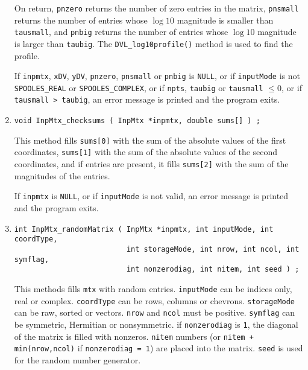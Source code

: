 \begin{enumerate}
On return, 
{\tt *pnzero} returns the number of zero entries in the matrix,
{\tt *pnsmall} returns the number of entries whose $\log10$ magnitude is
smaller than {\tt tausmall},
and 
{\tt *pnbig} returns the number of entries whose $\log10$ magnitude is
larger than {\tt taubig}.
The {\tt DVL\_log10profile()} method is used to find the profile.
\par {}
If {\tt inpmtx}, {\tt xDV}, {\tt yDV}, {\tt pnzero}, {\tt pnsmall} 
or {\tt pnbig} is {\tt NULL},
or if {\tt inputMode} is not {\tt SPOOLES\_REAL} 
or {\tt SPOOLES\_COMPLEX},
or if {\tt npts}, {\tt taubig} or {\tt tausmall} $\le 0$,
or if {\tt tausmall > taubig},
an error message is printed and the program exits.
\item
\begin{verbatim}
void InpMtx_checksums ( InpMtx *inpmtx, double sums[] ) ;
\end{verbatim}
This method fills {\tt sums[0]} with the sum of the absolute values
of the first coordinates,
{\tt sums[1]} with the sum of the absolute values
of the second coordinates,
and if entries are present, it fills {\tt sums[2]} 
with the sum of the magnitudes of the entries.
\par {}
If {\tt inpmtx} is {\tt NULL},
or if {\tt inputMode} is not valid,
an error message is printed and the program exits.
\item
\begin{verbatim}
int InpMtx_randomMatrix ( InpMtx *inpmtx, int inputMode, int coordType,
                          int storageMode, int nrow, int ncol, int symflag, 
                          int nonzerodiag, int nitem, int seed ) ;
\end{verbatim}
This methods fills {\tt mtx} with random entries.
{\tt inputMode} can be indices only, real or complex.
{\tt coordType} can be rows, columns or chevrons.
{\tt storageMode} can be raw, sorted or vectors.
{\tt nrow} and {\tt ncol} must be positive.
{\tt symflag} can be symmetric, Hermitian or nonsymmetric.
if {\tt nonzerodiag} is {\tt 1}, the diagonal of the matrix
is filled with nonzeros.
{\tt nitem} numbers (or {\tt nitem + min(nrow,ncol)} if
{\tt nonzerodiag = 1})
are placed into the matrix.
{\tt seed} is used for the random number generator.
\par {}

\end{enumerate}
